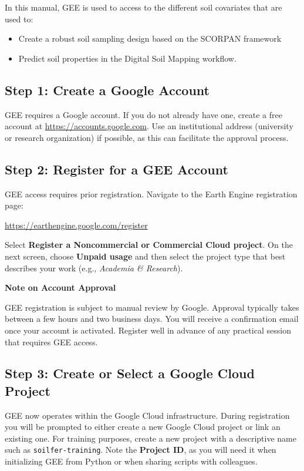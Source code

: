 \documentclass[
  10pt,
  b5paper,
  oneside]{book}
\providecommand{\tightlist}{%
  \setlength{\itemsep}{0pt}\setlength{\parskip}{0pt}}
\begin{document}
In this manual, GEE is used to access to the different soil covariates that are used to:

\begin{itemize}
\tightlist
\item
  Create a robust soil sampling design based on the SCORPAN framework
\item
  Predict soil properties in the Digital Soil Mapping workflow.
\end{itemize}

\subsection{Step 1: Create a Google Account}\label{step-1-create-a-google-account}

GEE requires a Google account. If you do not already have one, create a free account at \url{https://accounts.google.com}. Use an institutional address (university or research organization) if possible, as this can facilitate the approval process.

\subsection{Step 2: Register for a GEE Account}\label{step-2-register-for-a-gee-account}

GEE access requires prior registration. Navigate to the Earth Engine registration page:

\url{https://earthengine.google.com/register}

Select \textbf{Register a Noncommercial or Commercial Cloud project}. On the next screen, choose \textbf{Unpaid usage} and then select the project type that best describes your work (e.g., \emph{Academia \& Research}).

\textbf{Note on Account Approval}

GEE registration is subject to manual review by Google. Approval typically takes between a few hours and two business days. You will receive a confirmation email once your account is activated. Register well in advance of any practical session that requires GEE access.

\subsection{Step 3: Create or Select a Google Cloud Project}\label{step-3-create-or-select-a-google-cloud-project}

GEE now operates within the Google Cloud infrastructure. During registration you will be prompted to either create a new Google Cloud project or link an existing one. For training purposes, create a new project with a descriptive name such as \texttt{soilfer-training}. Note the \textbf{Project ID}, as you will need it when initializing GEE from Python or when sharing scripts with colleagues.
\end{document}
